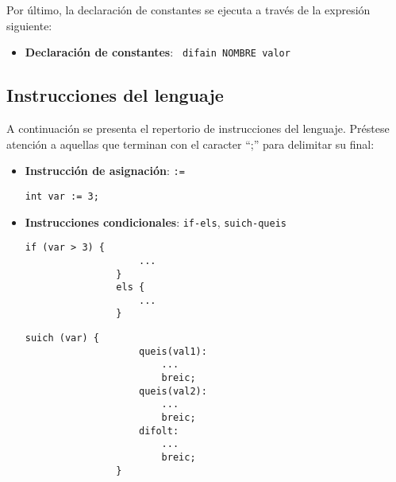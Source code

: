 \documentclass[10pt,a4paper]{article}
\begin{document}
Por último, la declaración de constantes se ejecuta a través de la expresión siguiente:
\begin{itemize}
    \item \textbf{Declaración de constantes}: \texttt{\color{blue} difain NOMBRE valor}
\end{itemize}

\subsection{Instrucciones del lenguaje}
A continuación se presenta el repertorio de instrucciones del lenguaje. Préstese atención a aquellas que terminan con el caracter ``;'' para delimitar su final:
\begin{itemize}
    \item \textbf{Instrucción de asignación}: \texttt{:=}
    \begin{center}
        \begin{minipage}{\linewidth}
            \begin{lstlisting}[linewidth=0.3\linewidth, gobble=16]
                int var := 3;
            \end{lstlisting}
        \end{minipage}
    \end{center}
    
    \item \textbf{Instrucciones condicionales}: \texttt{if-els}, \texttt{suich-queis}
    \begin{center}
        \begin{minipage}{\linewidth}
            \begin{lstlisting}[linewidth=0.3\linewidth, gobble=16]
                if (var > 3) {
                    ...
                }
                els {
                    ...
                }
            \end{lstlisting}
        \end{minipage}
    \end{center}
    \begin{center}
        \begin{minipage}{\linewidth}
            \begin{lstlisting}[linewidth=0.3\linewidth, gobble=16]
                suich (var) {
                    queis(val1):
                        ...
                        breic;
                    queis(val2):
                        ...
                        breic;
                    difolt:
                        ...
                        breic;
                }
            \end{lstlisting}
        \end{minipage}
    \end{center}


\end{itemize}
\end{document}
